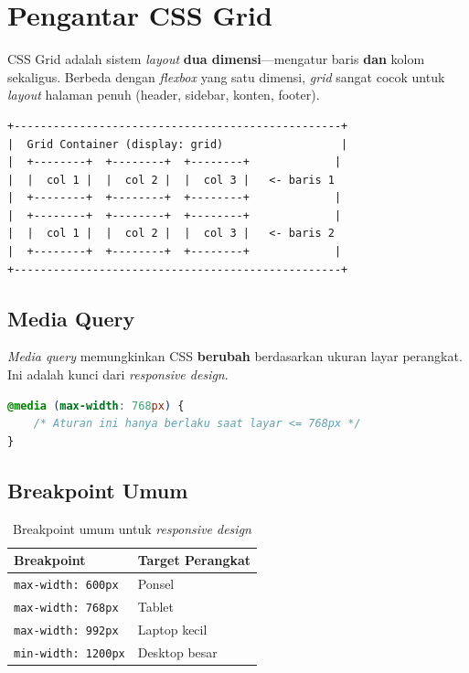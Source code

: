 \section{Pengantar CSS Grid}
\label{sec:pengantar-grid}

CSS Grid adalah sistem \emph{layout} \textbf{dua dimensi}---mengatur baris \textbf{dan} kolom sekaligus. Berbeda dengan \emph{flexbox} yang satu dimensi, \emph{grid} sangat cocok untuk \emph{layout} halaman penuh (header, sidebar, konten, footer).

\begin{lstlisting}[caption={Ilustrasi grid container dan cells}, label={lst:grid-illust}]
+--------------------------------------------------+
|  Grid Container (display: grid)                  |
|  +--------+  +--------+  +--------+             |
|  |  col 1 |  |  col 2 |  |  col 3 |   <- baris 1
|  +--------+  +--------+  +--------+             |
|  +--------+  +--------+  +--------+             |
|  |  col 1 |  |  col 2 |  |  col 3 |   <- baris 2
|  +--------+  +--------+  +--------+             |
+--------------------------------------------------+
\end{lstlisting}

\subsection{Media Query}
\label{subsec:media-query}

\emph{Media query} memungkinkan CSS \textbf{berubah} berdasarkan ukuran layar perangkat. Ini adalah kunci dari \emph{responsive design}.

\begin{lstlisting}[language=CSS, caption={Sintaks media query}, label={lst:media-query-basic}]
@media (max-width: 768px) {
    /* Aturan ini hanya berlaku saat layar <= 768px */
}
\end{lstlisting}

\subsection{Breakpoint Umum}
\label{subsec:breakpoint}

\begin{table}[h!]
\centering
\caption{Breakpoint umum untuk \emph{responsive design}}
\label{tab:breakpoint}
\begin{tabular}{|l|l|}
\hline
\textbf{Breakpoint} & \textbf{Target Perangkat} \\
\hline
\texttt{max-width: 600px} & Ponsel \\
\hline
\texttt{max-width: 768px} & Tablet \\
\hline
\texttt{max-width: 992px} & Laptop kecil \\
\hline
\texttt{min-width: 1200px} & Desktop besar \\
\hline
\end{tabular}
\end{table}

